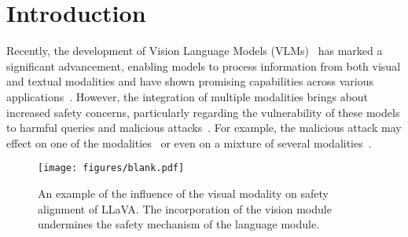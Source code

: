 \section{Introduction}




Recently, the development of Vision Language Models (VLMs)~\cite{gpt4v, anthropic2023claude,liu2024visual,liu2024improved} has marked a significant advancement, enabling models to process information from both visual and textual modalities and have shown promising capabilities across various applications~\cite{liu2024visual, MiniGPT-4, InstructBLIP, Qwen-VL&Qwen-VL-chat}. However, the integration of multiple modalities brings about increased safety concerns, particularly regarding the vulnerability of these models to harmful queries and malicious attacks~\cite{gong2023figstep,Liu_Zhu_Gu_Lan_Yang_Qiao_2024}.
For example, the malicious attack may effect on one of the modalities~\cite{gou2024eyes,zhang2024debiasing} or even on a mixture of several modalities~\cite{li2024images}.


\begin{figure}[t]
    \centering
    \texttt{[image: figures/blank.pdf]}
    \caption{An example of the influence of the visual modality on safety alignment of LLaVA. The incorporation of the vision module undermines the safety mechanism of the language module.}
    \label{fig:blank}
\end{figure}


